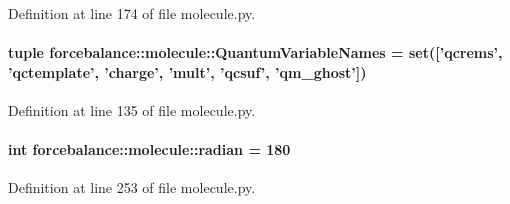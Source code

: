 \-Definition at line 174 of file molecule.\-py.

\hypertarget{namespaceforcebalance_1_1molecule_a483603baba28d76694b2d5f1e7b37813}{
\paragraph[{\-Quantum\-Variable\-Names}]{\setlength{\rightskip}{0pt plus 5cm}tuple {\bf forcebalance\-::molecule\-::\-Quantum\-Variable\-Names} = set(\mbox{[}'qcrems', 'qctemplate', 'charge', 'mult', 'qcsuf', 'qm\-\_\-ghost'\mbox{]})}}\label{namespaceforcebalance_1_1molecule_a483603baba28d76694b2d5f1e7b37813}


\-Definition at line 135 of file molecule.\-py.

\hypertarget{namespaceforcebalance_1_1molecule_a922ed32eb838098c0b77423c624a4487}{
\paragraph[{radian}]{\setlength{\rightskip}{0pt plus 5cm}int {\bf forcebalance\-::molecule\-::radian} = 180}}\label{namespaceforcebalance_1_1molecule_a922ed32eb838098c0b77423c624a4487}


\-Definition at line 253 of file molecule.\-py.

